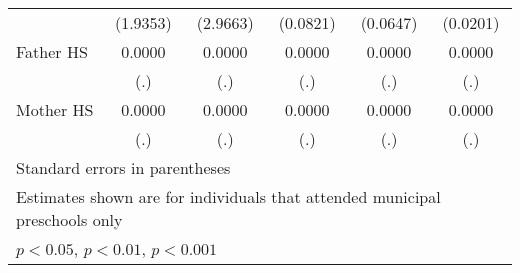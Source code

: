 \begin{table}[htbp]
\begin{tabular}{l*{5}{c}}
            &    (1.9353)         &    (2.9663)         &    (0.0821)         &    (0.0647)         &    (0.0201)         \\
\addlinespace
Father HS   &      0.0000         &      0.0000         &      0.0000         &      0.0000         &      0.0000         \\
            &         (.)         &         (.)         &         (.)         &         (.)         &         (.)         \\
\addlinespace
Mother HS   &      0.0000         &      0.0000         &      0.0000         &      0.0000         &      0.0000         \\
            &         (.)         &         (.)         &         (.)         &         (.)         &         (.)         \\
\bottomrule
\multicolumn{6}{l}{\footnotesize Standard errors in parentheses}\\
\multicolumn{6}{l}{\footnotesize Estimates shown are for individuals that attended municipal preschools only}\\
\multicolumn{6}{l}{\footnotesize \sym{*} \(p<0.05\), \sym{**} \(p<0.01\), \sym{***} \(p<0.001\)}\\
\end{tabular}
\end{table}
